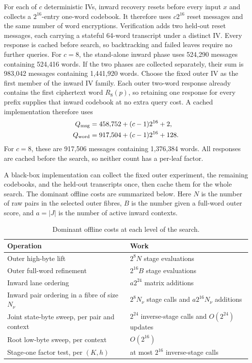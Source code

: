 \documentclass[10pt]{article}
\newcommand{\toprule}{\hline}
\newcommand{\midrule}{\hline}
\newcommand{\bottomrule}{\hline}}
\theoremstyle{plain}
\theoremstyle{definition}
\theoremstyle{remark}
\begin{document}
For each of \(c\) deterministic IVs, inward recovery resets before every input
\(x\) and collects a \(2^{16}\)-entry one-word codebook.
It therefore uses \(c2^{16}\) reset messages and the same number of word
encryptions.  Verification adds two held-out reset messages, each carrying a
stateful 64-word transcript under a distinct IV.  Every response is cached
before search, so backtracking and failed leaves require no further queries.
For \(c=8\), the stand-alone inward phase uses 524,290 messages containing
524,416 words.  If the two phases are collected separately, their sum is
983,042 messages containing 1,441,920 words.
Choose the fixed outer IV as the first member of the inward IV family.  Each
outer two-word response already contains the first ciphertext word
\(R_8(p)\), so retaining one response for every prefix supplies that inward
codebook at no extra query cost.  A cached implementation therefore uses
\begin{align}
Q_{\rm msg}&=458{,}752+(c-1)2^{16}+2,\nonumber\\
Q_{\rm word}&=917{,}504+(c-1)2^{16}+128.
\label{eq:uniquequeries}
\end{align}
For \(c=8\), these are 917,506 messages containing 1,376,384 words.  All
responses are cached before the search, so neither count has a per-leaf
factor.

A black-box implementation can collect the fixed outer experiment, the
remaining codebooks, and the held-out transcripts once, then cache them for
the whole search.  The dominant offline costs are summarized below.  Here
\(N\) is the number of raw pairs in the selected outer fibres, \(B\) is the
number given a full-word outer score, and \(a=|J|\) is the number of active
inward contexts.

\begin{table}[ht]
\centering
\caption{Dominant offline costs at each level of the search.}
\label{tab:work}
\small
\begin{tabular}{ll}
\toprule
Operation & Work \\ \midrule
Outer high-byte lift & \(2^8N\) stage evaluations \\
Outer full-word refinement & \(2^{16}B\) stage evaluations \\
Inward lane ordering & \(a2^{24}\) matrix additions \\
Inward pair ordering in a fibre of size \(N_\nu\) &
  \(2^8N_\nu\) stage calls and \(a2^{16}N_\nu\) additions \\
Joint state-byte sweep, per pair and context &
  \(2^{24}\) inverse-stage calls and \(O(2^{24})\) updates \\
Root low-byte sweep, per context & \(O(2^{16})\) \\
Stage-one factor test, per \((K,h)\) & at most \(2^{16}\) inverse-stage calls \\
\bottomrule
\end{tabular}
\end{table}
\end{document}

